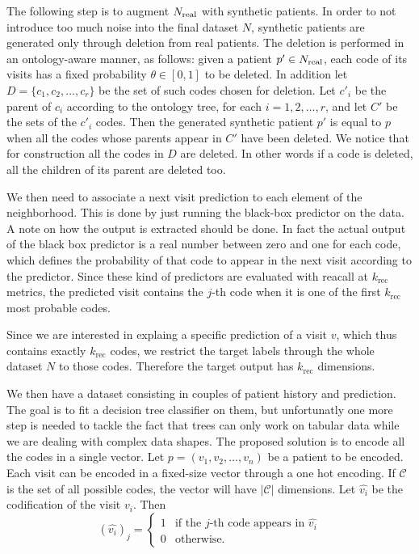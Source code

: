 \documentclass[]{marticle}
\newcommand{\codes}{\mathcal{C}}
\begin{document}
The following step is to augment $N_\text{real}$ with synthetic patients. In order to not introduce too
much noise into the final dataset $N$, synthetic patients are generated only through deletion from
real patients. The deletion is performed in an ontology-aware manner, as follows: given a patient
$p'\in N_\text{real}$, each code of its visits has a fixed probability $\theta\in [0,1]$ to be deleted. In
addition let $D=\{c_1, c_2, \dots, c_r\}$ be the set of such codes chosen for deletion. Let $c'_i$
be the parent of $c_i$ according to the ontology tree, for each $i=1,2,\dots,r$, and let $C'$ be the
sets of the $c'_i$ codes. Then the generated synthetic patient $p'$ is equal to $p$ when all the
codes whose parents appear in $C'$ have been deleted. We notice that for construction all the codes
in $D$ are deleted. In other words if a code is deleted, all the children of its parent are deleted
too.

We then need to associate a next visit prediction to each element of the neighborhood. This is done
by just running the black-box predictor on the data. A note on how the output is extracted should be
done. In fact the actual output of the black box predictor is a real number between zero and one for
each code, which defines the probability of that code to appear in the next visit according to the
predictor. Since these kind of predictors are evaluated with reacall at $k_\text{rec}$ metrics, the
predicted visit contains the $j$-th code when it is one of the first $k_\text{rec}$ most probable
codes. 

Since we are interested in explaing a specific prediction of a visit $v$, which thus contains
exactly $k_\text{rec}$ codes, we restrict the target labels through the whole dataset $N$ to those
codes. Therefore the target output has $k_\text{rec}$ dimensions.

We then have a dataset consisting in couples of patient history and prediction. The goal is to fit a
decision tree classifier on them, but unfortunatly one more step is needed to tackle the fact that
trees can only work on tabular data while we are dealing with complex data shapes. The proposed
solution is to encode all the codes in a single vector. Let $p=(v_1, v_2, \dots, v_n)$ be a patient
to be encoded. Each visit can be encoded in a fixed-size vector through a one hot encoding. If
$\codes$ is the set of all possible codes, the vector will have $|\codes|$ dimensions. Let
$\hat{v_i}$ be the codification of the visit $v_i$. Then
\begin{equation*}
    (\hat{v_i})_j = \begin{cases}
        1 &\text{if the $j$-th code appears in $\hat{v_i}$}  \\
        0 &\text{otherwise}.
    \end{cases}
\end{equation*}
\end{document}
